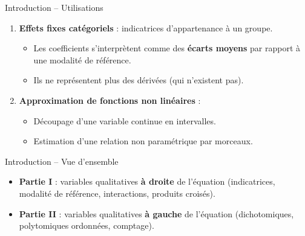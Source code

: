 \documentclass[11pt,aspectratio=169]{beamer}
\begin{document}
\begin{frame}{Introduction -- Utilisations}

\begin{enumerate}

\item \textbf{Effets fixes catégoriels} : indicatrices d'appartenance à un groupe.
  \begin{itemize}
  \item Les coefficients s'interprètent comme des \textbf{écarts moyens} par rapport à une modalité de référence.
  \item Ils ne représentent plus des dérivées (qui n'existent pas).
  \end{itemize}

\item \textbf{Approximation de fonctions non linéaires} :
  \begin{itemize}
  \item Découpage d'une variable continue en intervalles.
  \item Estimation d'une relation non paramétrique par morceaux.
  \end{itemize}

\end{enumerate}

\end{frame}

\begin{frame}{Introduction -- Vue d'ensemble}

\begin{center}
\end{center}

\vspace{0.5cm}

\begin{itemize}

\item \textbf{Partie I} : variables qualitatives \textbf{à droite} de l'équation (indicatrices, modalité de référence, interactions, produits croisés).\newline

\item \textbf{Partie II} : variables qualitatives \textbf{à gauche} de l'équation (dichotomiques, polytomiques ordonnées, comptage).

\end{itemize}

\end{frame}
\end{document}
